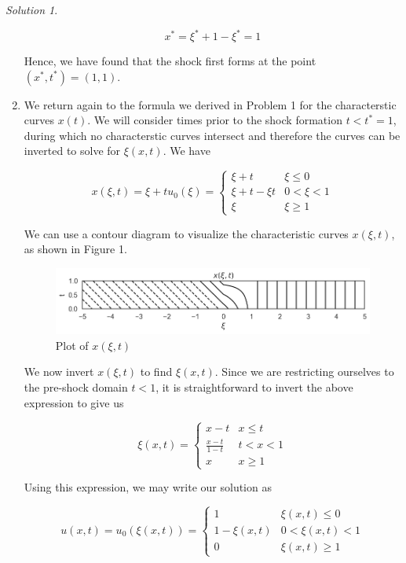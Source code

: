 \documentclass[12pt,a4paper]{article}
\theoremstyle{definition}
\theoremstyle{remark}
\newtheorem*{solution}{Solution}
\begin{document}
\begin{solution}
\begin{enumerate}[label=(\alph*)]
      $$x^* = \xi^* + 1 - \xi^* = 1$$

      Hence, we have found that the shock first forms at the point $(x^*, t^*)=(1,1)$. 

      \item We return again to the formula we derived in Problem 1 for the characterstic curves $x(t)$. We will consider times prior to the shock formation $t < t^* =1$, during which no characterstic curves intersect and therefore the curves can be inverted to solve for $\xi(x,t)$. We have
      
      $$x(\xi, t) = \xi + tu_0(\xi) = \begin{cases}
        \xi + t & \xi \le 0 \\
        \xi + t - \xi t & 0 < \xi < 1 \\
        \xi & \xi \ge 1
      \end{cases}$$

      We can use a contour diagram to visualize the characteristic curves $x(\xi, t)$, as shown in Figure 1. 

      \begin{figure}[h]
        \centering
        \includegraphics[width=\textwidth]{Fig1.png}
        \caption{Plot of $x(\xi, t)$}
        \label{fig:fig1}
      \end{figure}      

      We now invert $x(\xi, t)$ to find $\xi(x,t)$. Since we are restricting ourselves to the pre-shock domain $t < 1$, it is straightforward to invert the above expression to give us

      $$\xi(x,t) = \begin{cases} 
        x -t & x \le t \\
        \frac{x-t}{1-t} & t < x < 1 \\
        x & x \ge 1
      \end{cases}$$

      Using this expression, we may write our solution as 

      $$u(x,t) = u_0(\xi(x,t)) = \begin{cases}
        1 & \xi(x,t) \le 0 \\
        1-\xi(x,t) & 0 < \xi(x,t) < 1\\
        0 & \xi(x,t) \ge 1
      \end{cases}$$


\end{enumerate}
\end{solution}
\end{document}

